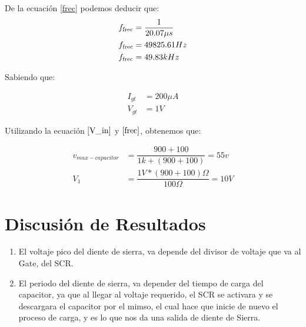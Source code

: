 \documentclass[osajnl,twocolumn,showpacs,superscriptaddress,10pt]{revtex4-1}
\begin{document}
De la ecuación \ref{frec} podemos deducir que:\\

\begin{align*}
f_{\textup{frec}} &= \dfrac{1}{20.07 \mu s}\\
f_{\textup{frec}} &= 49825.61 Hz\\
f_{\textup{frec}} &= 49.83 kHz
\end{align*}

Sabiendo que:

\begin{align*}
I_{gt} &= 200 \mu A\\
V_{gt} &= 1 V
\end{align*}

Utilizando la ecuación $\ref{V_in}$ y $\ref{frec}$, obtenemos que:

\begin{align*}
v_{max-capacitor} &= \dfrac{900 + 100}{1 k + (900 + 100)} = 55 v\\
V_{1} &= \dfrac{1 V * (900 + 100)\Omega}{100\Omega} = 10 V
\end{align*}


\section{Discusión de Resultados}

    
\begin{enumerate}
	\item El voltaje pico del diente de sierra, va depende del divisor de voltaje que va al Gate, del SCR.
	
	\item El periodo del diente de sierra, va depender del tiempo de carga del capacitor, ya que al llegar al voltaje requerido, el SCR se activara y se descargara el capacitor por el mimso, el cual hace que inicie de nuevo el proceso de carga, y es lo que nos da una salida de diente de Sierra.
\end{enumerate}
\end{document}
